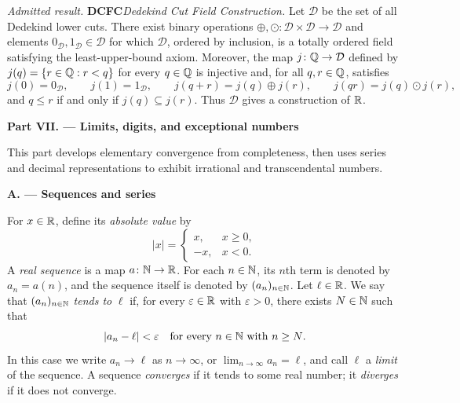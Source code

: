 \documentclass[10pt,a4paper]{article}
\newcommand{\nameditem}[2]{%
  \textbf{\textsf{#1}}\enspace\emph{#2.}\enspace
}
\newcommand{\admitted}[3]{%
  \par\smallskip\noindent\emph{Admitted result.}\enspace
  \nameditem{#1}{#2}#3\par
}
\newcommand{\exampart}[2]{%
  \clearpage
  \markboth{Part #1}{}
  \begin{center}
    {\large\bfseries Part #1. --- #2}
  \end{center}
}
\newcommand{\subpart}[1]{%
  \begin{center}
    \textbf{#1}
  \end{center}
}
\begin{document}
\admitted{DCFC}{Dedekind Cut Field Construction}{Let $\mathcal D$ be the set
of all Dedekind lower cuts.  There exist binary operations
$\oplus,\odot\colon\mathcal D\times\mathcal D\to\mathcal D$
and elements $0_{\mathcal D},1_{\mathcal D}\in\mathcal D$ for which
$\mathcal D$, ordered by inclusion, is a totally ordered field satisfying the
least-upper-bound axiom.  Moreover, the map
$j\colon\mathbb{Q}\to\mathcal D$ defined by
$j(q)=\{r\in\mathbb{Q}:r<q\}$ for every $q\in\mathbb{Q}$ is injective and, for all
$q,r\in\mathbb{Q}$, satisfies
\[
  j(0)=0_{\mathcal D},\qquad j(1)=1_{\mathcal D},\qquad
  j(q+r)=j(q)\oplus j(r),\qquad j(qr)=j(q)\odot j(r),
\]
and $q\leq r$ if and only if $j(q)\subseteq j(r)$.  Thus $\mathcal D$ gives
a construction of $\mathbb{R}$.}

\exampart{VII}{Limits, digits, and exceptional numbers}

This part develops elementary convergence from completeness, then uses
series and decimal representations to exhibit irrational and transcendental
numbers.

\subpart{A. --- Sequences and series}

For $x\in\mathbb{R}$, define its \emph{absolute value} by
\[
  |x|=\begin{cases}x,&x\geq0,\\-x,&x<0.\end{cases}
\]
A \emph{real sequence} is a map $a\colon\mathbb{N}\to\mathbb{R}$.  For each
$n\in\mathbb{N}$, its $n$th term is denoted by $a_n=a(n)$, and the sequence itself
is denoted by $(a_n)_{n\in\mathbb{N}}$.  Let $\ell\in\mathbb{R}$.  We say that
$(a_n)_{n\in\mathbb{N}}$ \emph{tends to} $\ell$ if, for every
$\varepsilon\in\mathbb{R}$ with $\varepsilon>0$, there exists $N\in\mathbb{N}$ such that
\[
  |a_n-\ell|<\varepsilon
  \quad\hbox{for every $n\in\mathbb{N}$ with $n\geq N$.}
\]
In this case we write $a_n\to\ell$ as $n\to\infty$, or
$\lim_{n\to\infty}a_n=\ell$, and call $\ell$ a \emph{limit} of the
sequence.  A sequence \emph{converges} if it tends to some real number; it
\emph{diverges} if it does not converge.
\end{document}
